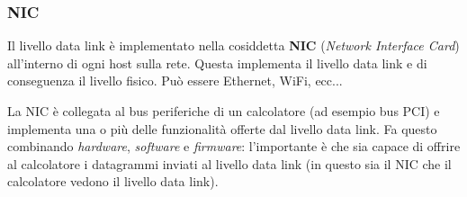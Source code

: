 \documentclass[a4paper,11pt]{article}
\begin{document}
\subsubsection{NIC}
Il livello data link è implementato nella cosiddetta \textbf{NIC} (\textit{Network Interface Card}) all'interno di ogni host sulla rete. Questa implementa il livello data link e di conseguenza il livello fisico. Può essere Ethernet, WiFi, ecc...

La NIC è collegata al bus periferiche di un calcolatore (ad esempio bus PCI) e implementa una o più delle funzionalità offerte dal livello data link.
Fa questo combinando \textit{hardware}, \textit{software} e \textit{firmware}: l'importante è che sia capace di offrire al calcolatore i datagrammi inviati al livello data link (in questo sia il NIC che il calcolatore vedono il livello data link).
\end{document}
